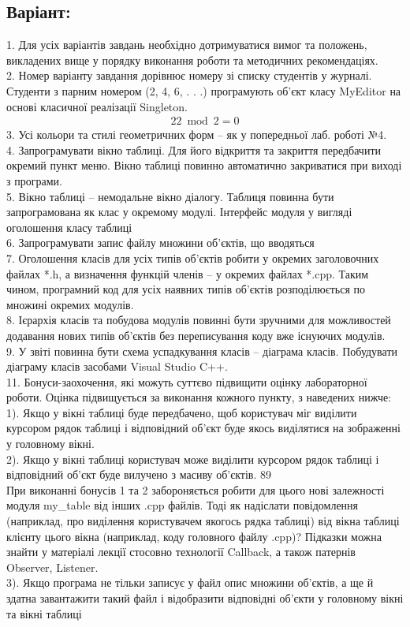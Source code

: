 \documentclass[14pt]{article}
\begin{document}
    \subsection{Варіант: }
    1. Для усіх варіантів завдань необхідно дотримуватися вимог та положень, викладених вище у порядку виконання роботи та методичних рекомендаціях. \\
    2. Номер варіанту завдання дорівнює номеру зі списку студентів у журналі. Студенти з парним номером (2, 4, 6, . . .) програмують об’єкт класу MyEditor на основі класичної реалізації Singleton. \\
    \begin{align}
        22 \bmod 2 = 0
    \end{align}
    3. Усі кольори та стилі геометричних форм – як у попередньої лаб. роботі №4. \\
    4. Запрограмувати вікно таблиці. Для його відкриття та закриття передбачити окремий пункт меню. Вікно таблиці повинно автоматично закриватися при виході з програми. \\
    5. Вікно таблиці – немодальне вікно діалогу. Таблиця повинна бути запрограмована як клас у окремому модулі. Інтерфейс модуля у вигляді оголошення класу таблиці \\
    6. Запрограмувати запис файлу множини об’єктів, що вводяться \\
    7. Оголошення класів для усіх типів об'єктів робити у окремих заголовочних файлах *.h, а визначення функцій членів – у окремих файлах *.cpp. Таким чином, програмний код для усіх наявних типів об'єктів розподілюється по множині окремих модулів. \\
    8. Ієрархія класів та побудова модулів повинні бути зручними для можливостей додавання нових типів об'єктів без переписування коду вже існуючих модулів. \\
    9. У звіті повинна бути схема успадкування класів – діаграма класів. Побудувати діаграму класів засобами Visual Studio C++. \\
    11. Бонуси-заохочення, які можуть суттєво підвищити оцінку лабораторної роботи. Оцінка підвищується за виконання кожного пункту, з наведених нижче: \\
    1). Якщо у вікні таблиці буде передбачено, щоб користувач міг виділити курсором рядок таблиці і відповідний об’єкт буде якось виділятися на зображенні у головному вікні. \\
    2). Якщо у вікні таблиці користувач може виділити курсором рядок таблиці і відповідний об’єкт буде вилучено з масиву об’єктів. 89 \\
    При виконанні бонусів 1 та 2 забороняється робити для цього нові залежності модуля my\_table від інших .cpp файлів. Тоді як надіслати повідомлення (наприклад, про виділення користувачем якогось рядка таблиці) від вікна таблиці клієнту цього вікна (наприклад, коду головного файлу .cpp)? Підказки можна знайти у матеріалі лекції стосовно технології Callback, а також патернів Observer, Listener. \\
    3). Якщо програма не тільки записує у файл опис множини об’єктів, а ще й здатна завантажити такий файл і відобразити відповідні об’єкти у головному вікні та вікні таблиці \\
\end{document}
